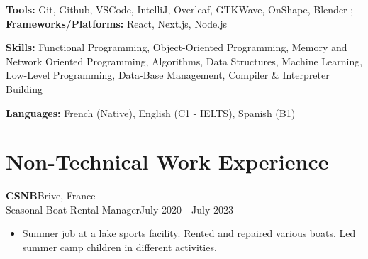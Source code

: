 \documentclass[a4paper, 10pt]{article}
\newenvironment{highlights}{
    \begin{itemize}[
        topsep=0.10 cm,
        parsep=0.10 cm,
        partopsep=0pt,
        itemsep=0pt,
        leftmargin=0.4 cm + 10pt
    ]
}{
    \end{itemize}
} %
\let\hrefWithoutArrow\href
\renewcommand{\href}[2]{\hrefWithoutArrow{#1}{\ifthenelse{\equal{#2}{}}{ }{#2 }\raisebox{.15ex}{\footnotesize \faExternalLink*}}}
\begin{document}
    \vspace{0.2 cm}
    
    \textbf{Tools:} Git, Github, VSCode, IntelliJ, Overleaf, GTKWave, OnShape, Blender ; \textbf{Frameworks/Platforms:} React, Next.js, Node.js
    
    \vspace{0.2cm}
    
    \textbf{Skills:} Functional Programming, Object-Oriented Programming, Memory and Network Oriented Programming, Algorithms, Data Structures, Machine Learning, Low-Level Programming, Data-Base Management, Compiler \& Interpreter Building
    
    \vspace{0.2cm}

    \textbf{Languages:} French (Native), English (C1 - IELTS\href{https://drive.google.com/file/d/18yDkgZtQfjBlhffuau9RirNduw-D5SH6/view?usp=sharing}{}), Spanish (B1)
    
    
    \section{Non-Technical Work Experience}
    
    \textbf{CSNB}\hfill Brive, France\\
    Seasonal Boat Rental Manager\hfill July 2020 - July 2023
    \begin{highlights}
        \item Summer job at a lake sports facility. Rented and repaired various boats. Led summer
        camp children in different activities.
    \end{highlights}
    
    
\end{document}
